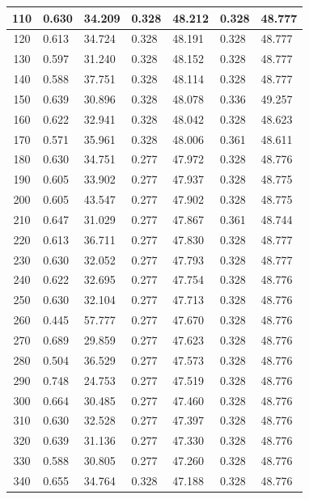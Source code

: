 \begin{longtable}{|c|l|l|l|l|l|l|}
        110 & 0.630 & 34.209 & 0.328 & 48.212 & 0.328 & 48.777 \\ \hline
        120 & 0.613 & 34.724 & 0.328 & 48.191 & 0.328 & 48.777 \\ \hline
        130 & 0.597 & 31.240 & 0.328 & 48.152 & 0.328 & 48.777 \\ \hline
        140 & 0.588 & 37.751 & 0.328 & 48.114 & 0.328 & 48.777 \\ \hline
        150 & 0.639 & 30.896 & 0.328 & 48.078 & 0.336 & 49.257 \\ \hline
        160 & 0.622 & 32.941 & 0.328 & 48.042 & 0.328 & 48.623 \\ \hline
        170 & 0.571 & 35.961 & 0.328 & 48.006 & 0.361 & 48.611 \\ \hline
        180 & 0.630 & 34.751 & 0.277 & 47.972 & 0.328 & 48.776 \\ \hline
        190 & 0.605 & 33.902 & 0.277 & 47.937 & 0.328 & 48.775 \\ \hline
        200 & 0.605 & 43.547 & 0.277 & 47.902 & 0.328 & 48.775 \\ \hline
        210 & 0.647 & 31.029 & 0.277 & 47.867 & 0.361 & 48.744 \\ \hline
        220 & 0.613 & 36.711 & 0.277 & 47.830 & 0.328 & 48.777 \\ \hline
        230 & 0.630 & 32.052 & 0.277 & 47.793 & 0.328 & 48.777 \\ \hline
        240 & 0.622 & 32.695 & 0.277 & 47.754 & 0.328 & 48.776 \\ \hline
        250 & 0.630 & 32.104 & 0.277 & 47.713 & 0.328 & 48.776 \\ \hline
        260 & 0.445 & 57.777 & 0.277 & 47.670 & 0.328 & 48.776 \\ \hline
        270 & 0.689 & 29.859 & 0.277 & 47.623 & 0.328 & 48.776 \\ \hline
        280 & 0.504 & 36.529 & 0.277 & 47.573 & 0.328 & 48.776 \\ \hline
        290 & 0.748 & 24.753 & 0.277 & 47.519 & 0.328 & 48.776 \\ \hline
        300 & 0.664 & 30.485 & 0.277 & 47.460 & 0.328 & 48.776 \\ \hline
        310 & 0.630 & 32.528 & 0.277 & 47.397 & 0.328 & 48.776 \\ \hline
        320 & 0.639 & 31.136 & 0.277 & 47.330 & 0.328 & 48.776 \\ \hline
        330 & 0.588 & 30.805 & 0.277 & 47.260 & 0.328 & 48.776 \\ \hline
        340 & 0.655 & 34.764 & 0.328 & 47.188 & 0.328 & 48.776 \\ \hline

\end{longtable}
